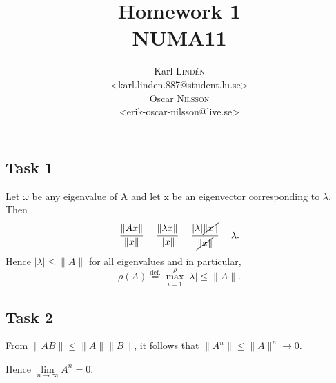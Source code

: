 \documentclass[a4paper,12pt]{article}
\begin{document}
\title{Homework 1 \\ NUMA11}
\author{
  Karl \textsc{Lind\'{e}n} \\
  <karl.linden.887@student.lu.se> \\
  Oscar \textsc{Nilsson} \\
  <erik-oscar-nilsson@live.se>
}

\maketitle
\clearpage

\subsection*{Task 1}
Let $\omega$ be any eigenvalue of A and let x be an eigenvector corresponding to $\lambda$. Then 
\begin{equation*}
\cfrac{\|Ax\|}{\|x\|}=\cfrac{\|\lambda x\|}{\|x\|}=\cfrac{ |\lambda|\cancel{\|x\|}}{\cancel{\|x\|}}=\lambda.
\end{equation*}
Hence $|\lambda| \le \|A\|$ for all eigenvalues and in particular,
\begin{equation*}
\rho\left(A\right) \overset{\text{def.}}{=} \overset{\rho}{\underset{i=1}{\max}}|\lambda| \le \|A\|.
\end{equation*}

\subsection*{Task 2}
From $\|AB\| \le \|A\|\|B\|$, it follows that $\|A^n\|\le \|A\|^n \rightarrow 0$. 

Hence $\lim\limits_{n\rightarrow \infty }A^n=0$.
\end{document}
